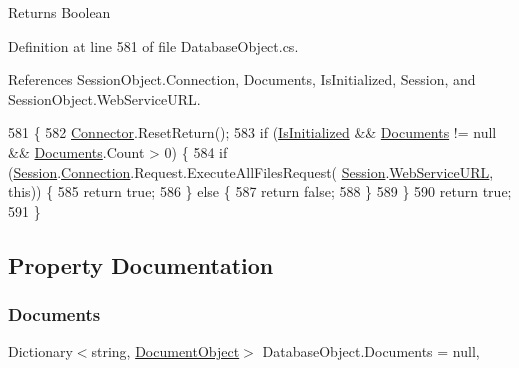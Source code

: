 \begin{DoxyReturn}{Returns}
Boolean
\end{DoxyReturn}


Definition at line 581 of file Database\+Object.\+cs.



References Session\+Object.\+Connection, Documents, Is\+Initialized, Session, and Session\+Object.\+Web\+Service\+U\+RL.


\begin{DoxyCode}
581                                     \{
582         \mbox{\hyperlink{class_connector}{Connector}}.ResetReturn();
583         \textcolor{keywordflow}{if} (\mbox{\hyperlink{class_database_object_a5fe036d32a30eb10d1b3f6a30263f740}{IsInitialized}} && \mbox{\hyperlink{class_database_object_afaf1159aa427c5bcce01c4b8c6f34514}{Documents}} != null && 
      \mbox{\hyperlink{class_database_object_afaf1159aa427c5bcce01c4b8c6f34514}{Documents}}.Count > 0) \{
584             \textcolor{keywordflow}{if} (\mbox{\hyperlink{class_database_object_aa8484162b7d2a7c4c9426bca13c64c07}{Session}}.\mbox{\hyperlink{class_session_object_a014bdbf705a753540e19bfb53030c55c}{Connection}}.Request.ExecuteAllFilesRequest(
      \mbox{\hyperlink{class_database_object_aa8484162b7d2a7c4c9426bca13c64c07}{Session}}.\mbox{\hyperlink{class_session_object_a697c071c812fbf7ad1166b896fb44c16}{WebServiceURL}}, \textcolor{keyword}{this})) \{
585                 \textcolor{keywordflow}{return} \textcolor{keyword}{true};
586             \} \textcolor{keywordflow}{else} \{
587                 \textcolor{keywordflow}{return} \textcolor{keyword}{false};
588             \}
589         \}
590         \textcolor{keywordflow}{return} \textcolor{keyword}{true};
591     \}
\end{DoxyCode}


\subsection{Property Documentation}
\mbox{\label{class_database_object_afaf1159aa427c5bcce01c4b8c6f34514}} 
\subsubsection{\texorpdfstring{Documents}{Documents}}
{\footnotesize\ttfamily Dictionary$<$string, \mbox{\hyperlink{class_document_object}{Document\+Object}}$>$ Database\+Object.\+Documents = null\hspace{0.3cm}{\ttfamily [get]}, {\ttfamily [set]}}



